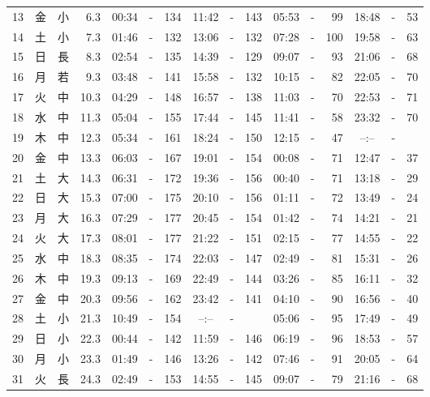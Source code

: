 \documentclass[12pt.a4j]{jsarticle}
\begin{document}
\begin{center}
\begin{table}[ht]
\begin{tabular}{|rc|cr|ccrccr|ccrccr|}
13 & 金 & 小 &  6.3 &  00:34 &-& 134  &  11:42 &-& 143  &   05:53 &-&  99  &   18:48 &-&  53  \\
14 & 土 & 小 &  7.3 &  01:46 &-& 132  &  13:06 &-& 132  &   07:28 &-& 100  &   19:58 &-&  63  \\
15 & 日 & 長 &  8.3 &  02:54 &-& 135  &  14:39 &-& 129  &   09:07 &-&  93  &   21:06 &-&  68  \\
16 & 月 & 若 &  9.3 &  03:48 &-& 141  &  15:58 &-& 132  &   10:15 &-&  82  &   22:05 &-&  70  \\
17 & 火 & 中 & 10.3 &  04:29 &-& 148  &  16:57 &-& 138  &   11:03 &-&  70  &   22:53 &-&  71  \\
18 & 水 & 中 & 11.3 &  05:04 &-& 155  &  17:44 &-& 145  &   11:41 &-&  58  &   23:32 &-&  70  \\
19 & 木 & 中 & 12.3 &  05:34 &-& 161  &  18:24 &-& 150  &   12:15 &-&  47  &   --:-- &-&     \\
20 & 金 & 中 & 13.3 &  06:03 &-& 167  &  19:01 &-& 154  &   00:08 &-&  71  &   12:47 &-&  37  \\
21 & 土 & 大 & 14.3 &  06:31 &-& 172  &  19:36 &-& 156  &   00:40 &-&  71  &   13:18 &-&  29  \\
22 & 日 & 大 & 15.3 &  07:00 &-& 175  &  20:10 &-& 156  &   01:11 &-&  72  &   13:49 &-&  24  \\
23 & 月 & 大 & 16.3 &  07:29 &-& 177  &  20:45 &-& 154  &   01:42 &-&  74  &   14:21 &-&  21  \\
24 & 火 & 大 & 17.3 &  08:01 &-& 177  &  21:22 &-& 151  &   02:15 &-&  77  &   14:55 &-&  22  \\
25 & 水 & 中 & 18.3 &  08:35 &-& 174  &  22:03 &-& 147  &   02:49 &-&  81  &   15:31 &-&  26  \\
26 & 木 & 中 & 19.3 &  09:13 &-& 169  &  22:49 &-& 144  &   03:26 &-&  85  &   16:11 &-&  32  \\
27 & 金 & 中 & 20.3 &  09:56 &-& 162  &  23:42 &-& 141  &   04:10 &-&  90  &   16:56 &-&  40  \\
28 & 土 & 小 & 21.3 &  10:49 &-& 154  &  --:-- &-&     &   05:06 &-&  95  &   17:49 &-&  49  \\
29 & 日 & 小 & 22.3 &  00:44 &-& 142  &  11:59 &-& 146  &   06:19 &-&  96  &   18:53 &-&  57  \\
30 & 月 & 小 & 23.3 &  01:49 &-& 146  &  13:26 &-& 142  &   07:46 &-&  91  &   20:05 &-&  64  \\
31 & 火 & 長 & 24.3 &  02:49 &-& 153  &  14:55 &-& 145  &   09:07 &-&  79  &   21:16 &-&  68  \\

\end{tabular}
\end{table}
\end{center}
\end{document}
